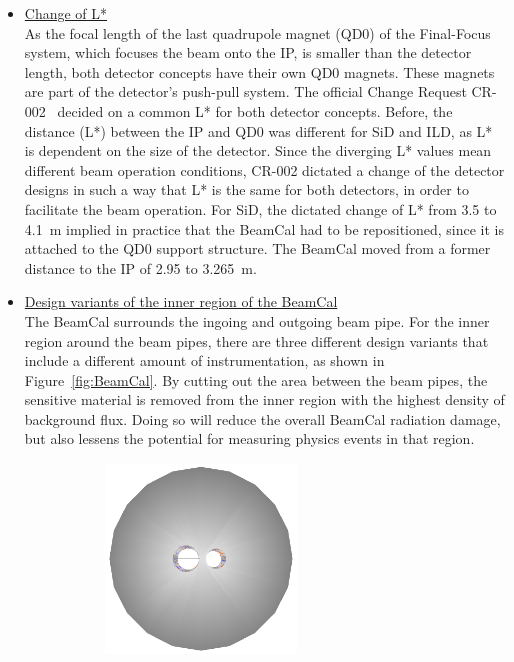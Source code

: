 \begin{itemize}
 \item \underline{Change of L*}\\
 As the focal length of the last quadrupole magnet (QD0) of the Final-Focus system, which focuses the beam onto the IP, is smaller than the detector length, both detector concepts have their own QD0 magnets.
 These magnets are part of the detector's push-pull system.
 The official Change Request CR-002~\cite{CR-002} decided on a common L* for both detector concepts.
 Before, the distance (L*) between the IP and QD0 was different for SiD and ILD, as L* is dependent on the size of the detector.
 Since the diverging L* values mean different beam operation conditions, CR-002 dictated a change of the detector designs in such a way that L* is the same for both detectors, in order to facilitate the beam operation.
 For SiD, the dictated change of L* from 3.5 to \SI{4.1}{\meter} implied in practice that the BeamCal had to be repositioned, since it is attached to the QD0 support structure. 
 The BeamCal moved from a former distance to the IP of 2.95 to \SI{3.265}{\meter}.~\cite{SiDBkgNote}
 \item \underline{Design variants of the inner region of the BeamCal}\\
 The BeamCal surrounds the ingoing and outgoing beam pipe.
 For the inner region around the beam pipes, there are three different design variants that include a different amount of instrumentation, as shown in Figure~\ref{fig:BeamCal}.
 By cutting out the area between the beam pipes, the sensitive material is removed from the inner region with the highest density of background flux.
 Doing so will reduce the overall BeamCal radiation damage, but also lessens the potential for measuring physics events in that region.
 \begin{figure}
 \centering
  \begin{subfigure}[b]{0.3\textwidth}
   \centering
    \includegraphics[width=0.6\textwidth]{Figures/beamcal_plug.png}

\end{subfigure}
\end{figure}
\end{itemize}
